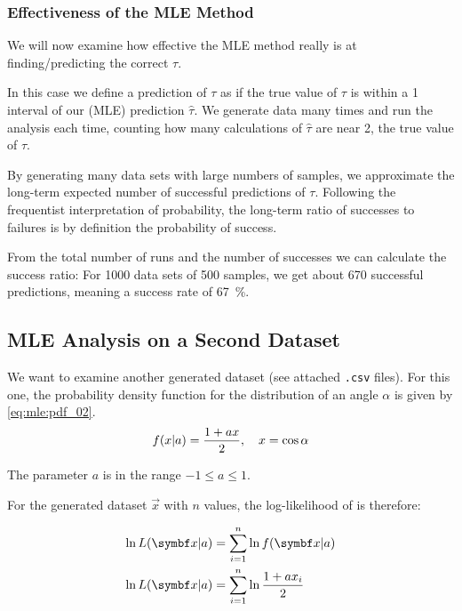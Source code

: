 \subsubsection{Effectiveness of the MLE Method}

We will now examine how effective the MLE method really is at finding/predicting the correct \( \tau \).

In this case we define a prediction of \( \tau \) as  if the true value of $\tau$ is within a \qty{1}{\sigma} interval of our (MLE) prediction $\hat{\tau}$. We generate data many times and run the analysis each time, counting how many calculations of \( \hat{\tau} \) are near \num{2}, the true value of \( \tau \).

By generating many data sets with large numbers of samples, we approximate the long-term expected number of successful predictions of $\tau$. Following the frequentist interpretation of probability, the long-term ratio of successes to failures is by definition the probability of success.

From the total number of runs and the number of successes we can calculate the success ratio: For \num{1000} data sets of \num{500} samples, we get about \num{670} successful predictions, meaning a success rate of \qty{67}{\percent}.


\subsection{MLE Analysis on a Second Dataset}

We want to examine another generated dataset (see attached \verb|.csv| files). For this one, the probability density function for the distribution of an angle $\alpha$ is given by \autoref{eq:mle:pdf_02}.
\begin{gather}
    f(x\vert a) = \frac{1 + a x}{2}, \quad x = \cos \alpha
    \label{eq:mle:pdf_02}
\end{gather}

The parameter $a$ is in the range $-1 \le a \le 1$.

For the generated dataset $\vec{x}$ with $n$ values, the log-likelihood of is therefore:

\begin{align}
    \ln L(\vec{x}\given a) &= \sum \limits_{i=1}^{n} \ln f(\vec{x}\given a) \\
    \ln L(\vec{x}\given a) &= \sum \limits_{i=1}^{n} \ln \frac{1 + a x_i}{2}
\end{align}

